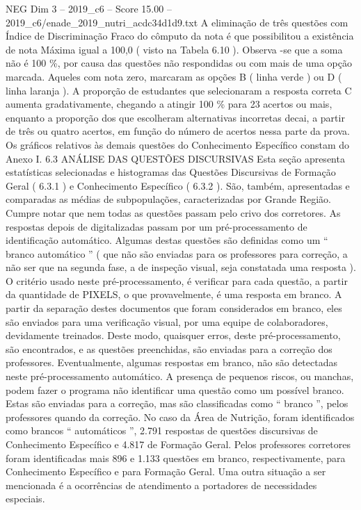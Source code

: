 \begin{textsample}{NEG Dim 3 – 2019\_c6 – Score 15.00 – 2019\_c6/enade\_2019\_nutri\_acdc34d1d9.txt}
A eliminação de três questões com Índice de Discriminação Fraco do cômputo da nota é que possibilitou a existência de nota Máxima igual a 100,0 ( visto na Tabela 6.10 ).
Observa -se que a soma não é 100 \%, por causa das questões não respondidas ou com mais de uma opção marcada.
Aqueles com nota zero, marcaram as opções B ( linha verde ) ou D ( linha laranja ).
A proporção de estudantes que selecionaram a resposta correta C aumenta gradativamente, chegando a atingir 100 \% para 23 acertos ou mais, enquanto a proporção dos que escolheram alternativas incorretas decai, a partir de três ou quatro acertos, em função do número de acertos nessa parte da prova.
Os gráficos relativos às demais questões do Conhecimento Específico constam do Anexo I. 6.3 ANÁLISE DAS QUESTÕES DISCURSIVAS Esta seção apresenta estatísticas selecionadas e histogramas das Questões Discursivas de Formação Geral ( 6.3.1 ) e Conhecimento Específico ( 6.3.2 ).
São, também, apresentadas e comparadas as médias de subpopulações, caracterizadas por Grande Região.
Cumpre notar que nem todas as questões passam pelo crivo dos corretores.
As respostas depois de digitalizadas passam por um pré-processamento de identificação automático.
Algumas destas questões são definidas como um “ branco automático ” ( que não são enviadas para os professores para correção, a não ser que na segunda fase, a de inspeção visual, seja constatada uma resposta ).
O critério usado neste pré-processamento, é verificar para cada questão, a partir da quantidade de PIXELS, o que provavelmente, é uma resposta em branco.
A partir da separação destes documentos que foram considerados em branco, eles são enviados para uma verificação visual, por uma equipe de colaboradores, devidamente treinados.
Deste modo, quaisquer erros, deste pré-processamento, são encontrados, e as questões preenchidas, são enviadas para a correção dos professores.
Eventualmente, algumas respostas em branco, não são detectadas neste pré-processamento automático.
A presença de pequenos riscos, ou manchas, podem fazer o programa não identificar uma questão como um possível branco.
Estas são enviadas para a correção, mas são classificadas como “ branco ”, pelos professores quando da correção.
No caso da Área de Nutrição, foram identificados como brancos “ automáticos ”, 2.791 respostas de questões discursivas de Conhecimento Específico e 4.817 de Formação Geral.
Pelos professores corretores foram identificadas mais 896 e 1.133 questões em branco, respectivamente, para Conhecimento Específico e para Formação Geral.
Uma outra situação a ser mencionada é a ocorrências de atendimento a portadores de necessidades especiais.

\end{textsample}
